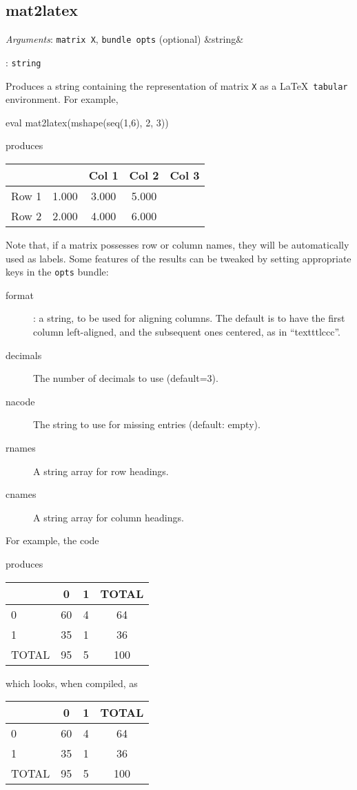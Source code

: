 \documentclass[11pt,english]{article}
\newcommand{\ArgRet}[2]{%
  {\it Arguments}: {#1}%
  \ifx&#2&%
  \else
  \par\smallskip\noindent {\it Return type}: \texttt{#2}
  \fi%
  \par\medskip\par%
  }
\begin{document}
\subsection{mat2latex}

\ArgRet{\texttt{matrix X}, \texttt{bundle opts} (optional)}{string}

Produces a string containing the representation of matrix \texttt{X}
as a \LaTeX\ \texttt{tabular} environment. For example,
\begin{code}
eval mat2latex(mshape(seq(1,6), 2, 3))
\end{code}
produces
\begin{code}
\begin{tabular}{lccc}
\hline
 &	  &	 Col 1  &	 Col 2  &	 Col 3 \\ \hline
Row 1 & 1.000	 & 3.000	 & 5.000 \\
Row 2 & 2.000	 & 4.000	 & 6.000 \\
\hline
\end{tabular}
\end{code}
Note that, if a matrix possesses row or column names, they will be
automatically used as labels. Some features of the results can be
tweaked by setting appropriate keys in the \texttt{opts} bundle:
\begin{description}
\item[format]: a string, to be used for aligning columns. The default
  is to have the first column left-aligned, and the subsequent ones
  centered, as in ``texttt{lccc}''.
\item[decimals] The number of decimals to use (default=3).
\item[nacode] The string to use for missing entries (default: empty).
\item[rnames] A string array for row headings.
\item[cnames] A string array for column headings.
\end{description}

For example, the code
produces
\begin{code}
\begin{tabular}{lccc}
\hline
 &	   0  &	    1  &	 TOTAL \\ \hline
   0 & 60	 & 4	 & 64 \\
   1 & 35	 & 1	 & 36 \\
TOTAL & 95	 & 5	 & 100 \\
\hline
\end{tabular}
\end{code}
which looks, when compiled, as
\begin{center}
\begin{tabular}{lccc}
\hline
 &	   0  &	    1  &	 TOTAL \\ \hline
   0 & 60	 & 4	 & 64 \\
   1 & 35	 & 1	 & 36 \\
TOTAL & 95	 & 5	 & 100 \\
\hline
\end{tabular}
\end{center}
\end{document}
